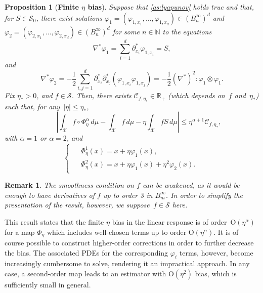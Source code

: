 \documentclass[11pt]{article}
\newcommand{\R}{\mathbb{R}}
\newcommand{\N}{\mathbb{N}}
\renewcommand{\S}{\mathscr{S}}
\newcommand{\bigO}{\mathrm{O}}
\renewcommand{\leq}{\leqslant}
\newtheorem{remark}[theorem]{Remark}
\newtheorem{proposition}[theorem]{Proposition}
\theoremstyle{definition}
\begin{document}
\begin{proposition}[{\bf Finite $\eta$ bias}]
\label{prop:gen_subtraction}
Suppose that \cref{as:lyapunov} holds true and that, for $S\in\S_0$, there exist solutions $\varphi_1 = (\varphi_{1,x_1},\dotsc,\varphi_{1,x_d}) \in (B^\infty_n)^d$ and $\varphi_2=(\varphi_{2,x_1},\dotsc,\varphi_{2,x_d}) \in (B^\infty_n)^d$ for some $n\in\N$ to the equations
\begin{equation}
	\nabla^*\varphi_1 = \sum_{i=1}^d \partial_{x_i}^* \varphi_{1,x_i} = S, \label{eq:varphi1_PDE}
\end{equation}
and
\begin{equation}
	\nabla^*\varphi_2 = -\frac{1}{2}\sum_{i,j=1}^d \partial_{x_i}^*\partial_{x_j}^* (\varphi_{1,x_i}\varphi_{1,x_j}) = -\frac{1}{2}(\nabla^*)^2 \colon \varphi_1\otimes \varphi_1.
	\label{eq:varphi2_PDE}
\end{equation}
Fix $\eta_*>0$, and $f\in \S$. Then, there exists $\mathcal{C}_{f,\eta_*} \in\R_+$ (which depends on~$f$ and~$\eta_*$) such that, for any~$|\eta| \leq \eta_*$,
\begin{equation}
	\qquad \left|\int_\mathcal{X} f\circ\Phi^\alpha_\eta \, d\mu - \int_\mathcal{X} f \, d\mu - \eta\int_\mathcal{X} f S \, d\mu\right| \leq \eta^{\alpha+1} \mathcal{C}_{f,\eta_*},
	\label{eq:prop_eta_bias_bound}
\end{equation}
with $\alpha=1$ or $\alpha=2$, and
\begin{equation}
\begin{cases}
\begin{aligned}
	&\Phi_\eta^1(x) = x + \eta\varphi_1(x), \\
	&\Phi_\eta^2(x) = x + \eta\varphi_1(x) + \eta^2\varphi_2(x).
\end{aligned}
\end{cases}
\label{eq:Phi_alpha}
\end{equation}
\end{proposition}

\begin{remark}
The smoothness condition on $f$ can be weakened, as it would be enough to have derivatives of $f$ up to order 3 in $B^\infty_m$. In order to simplify the presentation of the result, however, we suppose~$f\in \S$ here.
\end{remark}

This result states that the finite $\eta$ bias in the linear response is of order~$\bigO(\eta^{\alpha})$ for a map $\Phi_\eta$ which includes well-chosen terms up to order $\bigO(\eta^\alpha)$. It is of course possible to construct higher-order corrections in order to further decrease the bias. The associated PDEs for the corresponding $\varphi_i$ terms, however, become increasingly cumbersome to solve, rendering it an impractical approach. In any case, a second-order map leads to an estimator with $\bigO(\eta^2)$ bias, which is sufficiently small in general.
\end{document}
